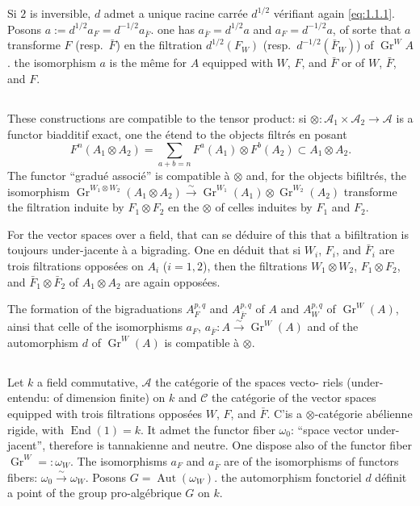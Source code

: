 \documentclass[12pt,a4paper]{article}
\theoremstyle{plain}
\theoremstyle{definition}
\DeclareMathOperator{\Gr}{Gr}
\DeclareMathOperator{\Aut}{Aut}
\DeclareMathOperator{\End}{End}
\newcommand{\A}{\mathcal{A}}
\begin{document}
\begin{remark}\label{rem:1.3}
Si $2$ is inversible, $d$ admet a unique racine carr\'{e}e $d^{1/2}$
v\'{e}rifiant again \eqref{eq:1.1.1}. Posons $a := d^{1/2} a_F = d^{-1/2} a_{\bar{F}}$. one has $a_{\bar{F}} = d^{1/2} a$
and $a_F = d^{-1/2} a$, of sorte that $a$ transforme $F$ (resp.~$\bar{F}$) en the filtration
$d^{1/2}(F_W)$ (resp.~$d^{-1/2}(\bar{F}_W)$) of $\Gr^W\!A$. the isomorphism $a$ is the m\^{e}me
for $A$ equipped with $W$, $F$, and $\bar{F}$ or of $W$, $\bar{F}$, and $F$.
\end{remark}

\subsection{}

These constructions are compatible to the tensor product: si $\otimes :
\A_1 \times \A_2 \to \A$ is a functor biadditif exact, one the \'{e}tend to the objects filtr\'{e}s
en posant
\begin{equation*}
F^n(A_1 \otimes A_2) = \sum_{a+b=n} F^a(A_1) \otimes F^b(A_2) \subset A_1 \otimes A_2.
\end{equation*}
The functor ``gradu\'{e} associ\'{e}'' is compatible \`{a} $\otimes$ and, for the objects bifiltr\'{e}s,
the isomorphism $\Gr^{W_1 \otimes W_2}(A_1 \otimes A_2) \xrightarrow{\sim} \Gr^{W_1}(A_1) \otimes \Gr^{W_2}(A_2)$ transforme the
filtration induite by $F_1 \otimes F_2$ en the $\otimes$ of celles induites by $F_1$ and $F_2$.

For the vector spaces over a field, that can se d\'{e}duire of this that a
bifiltration is toujours under-jacente \`{a} a bigrading. One en d\'{e}duit that si
$W_i$, $F_i$, and $\bar{F}_i$ are trois filtrations oppos\'{e}es on $A_i$ ($i=1,2$), then
the filtrations $W_1 \otimes W_2$, $F_1 \otimes F_2$, and $\bar{F}_1 \otimes \bar{F}_2$ of $A_1 \otimes A_2$ are again oppos\'{e}es.

The formation of the bigraduations $A_F^{p,q}$ and $A_{\bar{F}}^{p,q}$ of $A$ and $A_{W}^{p,q}$ of $\Gr^W\!(A)$, ainsi
that celle of the isomorphisms $a_F$, $a_{\bar{F}} : A \xrightarrow{\sim} \Gr^W\!(A)$ and of the automorphism
$d$ of $\Gr^W\!(A)$ is compatible \`{a} $\otimes$.

\subsection{}

Let $k$ a field commutative, $\A$ the cat\'{e}gorie of the spaces vecto-
riels (under-entendu: of dimension finite) on $k$ and $\mathscr{C}$ the cat\'{e}gorie of the vector spaces equipped with trois filtrations oppos\'{e}es $W$, $F$, and $\bar{F}$. C'is a $\otimes$-cat\'{e}gorie ab\'{e}lienne rigide, with $\End(1) = k$. It admet the functor fiber
$\omega_0$: ``space vector under-jacent'', therefore is tannakienne and neutre. One dispose also of the functor fiber $\Gr^W =: \omega_W$. The isomorphisms $a_F$ and $a_{\bar{F}}$ are
of the isomorphisms of functors fibers: $\omega_0 \xrightarrow{\sim} \omega_W$. Posons $G = \Aut(\omega_W)$.
the automorphism fonctoriel $d$ d\'{e}finit a point of the group pro-alg\'{e}brique $G$
on $k$.
\end{document}

